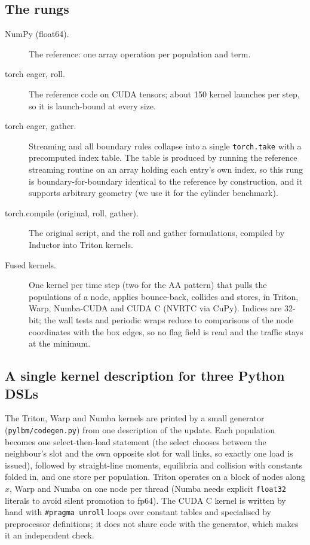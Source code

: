 \documentclass[11pt]{article}
\begin{document}
\subsection{The rungs}
\begin{description}
\item[NumPy (float64).] The reference: one array operation per population and term.
\item[torch eager, roll.] The reference code on CUDA tensors; about 150 kernel launches per
step, so it is launch-bound at every size.
\item[torch eager, gather.] Streaming and all boundary rules collapse into a single
\texttt{torch.take} with a precomputed index table. The table is produced by running the
reference streaming routine on an array holding each entry's own index, so this rung is
boundary-for-boundary identical to the reference by construction, and it supports arbitrary
geometry (we use it for the cylinder benchmark).
\item[torch.compile (original, roll, gather).] The original script, and the roll and
gather formulations, compiled by Inductor into Triton kernels.
\item[Fused kernels.] One kernel per time step (two for the AA pattern) that pulls the
populations of a node, applies bounce-back, collides and stores, in Triton, Warp,
Numba-CUDA and CUDA C (NVRTC via CuPy). Indices are 32-bit; the wall tests and periodic
wraps reduce to comparisons of the node coordinates with the box edges, so no flag field is
read and the traffic stays at the minimum.
\end{description}

\subsection{A single kernel description for three Python DSLs}
The Triton, Warp and Numba kernels are printed by a small generator
(\texttt{pylbm/codegen.py}) from one description of the update. Each population becomes one
select-then-load statement (the select chooses between the neighbour's slot and the own
opposite slot for wall links, so exactly one load is issued), followed by straight-line
moments, equilibria and collision with constants folded in, and one store per population.
Triton operates on a block of nodes along $x$, Warp and Numba on one node per thread (Numba
needs explicit \texttt{float32} literals to avoid silent promotion to fp64). The CUDA C kernel is written by
hand with \texttt{\#pragma unroll} loops over constant tables and specialised by preprocessor
definitions; it does not share code with the generator, which makes it an independent check.
\end{document}
